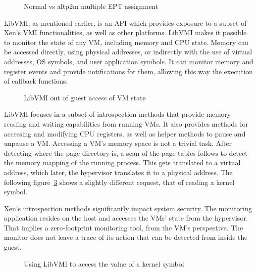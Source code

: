 \begin{figure}[ht]
	\centering
	\scalebox{0.95}{}
	\caption{Normal vs altp2m multiple \ac{EPT} assignment}
	\label{fig:ept}
\end{figure}

\par LibVMI, as mentioned earlier, is an \ac{API} which provides exposure to a subset of Xen’s \ac{VMI} functionalities, as well as other platforms. LibVMI makes it possible to monitor the state of any \ac{VM}, including memory and \ac{CPU} state. Memory can be accessed directly, using physical addresses, or indirectly with the use of virtual addresses, \ac{OS} symbols, and user application symbols. It can monitor memory and register events and provide notifications for them, allowing this way the execution of callback functions. 


\begin{figure}[ht]
	\centering
	
	\caption{LibVMI out of guest access of \ac{VM} state}
	\label{fig:libvmi}
\end{figure}

\par LibVMI focuses in a subset of introspection methods that provide memory reading and writing capabilities from running \ac{VM}s. It also provides methods for accessing and modifying \ac{CPU} registers, as well as helper methods to pause and unpause a \ac{VM}. Accessing a \ac{VM}'s memory space is not a trivial task. After detecting where the page directory is, a scan of the page tables follows to detect the memory mapping of the running process. This gets translated to a virtual address, which later, the hypervisor translates it to a physical address. The following figure~\ref{fig:accesskernel} shows a slightly different request, that of reading a kernel symbol.

\par Xen’s introspection methods significantly impact system security. The monitoring application resides on the host and accesses the \ac{VM}s' state from the hypervisor. That implies a zero-footprint monitoring tool, from the \ac{VM}'s perspective. The monitor does not leave a trace of its action that can be detected from inside the guest.

\begin{figure}[ht]
	\centering
	
	\caption{Using LibVMI to access the value of a kernel symbol}
	\label{fig:accesskernel}
\end{figure}

